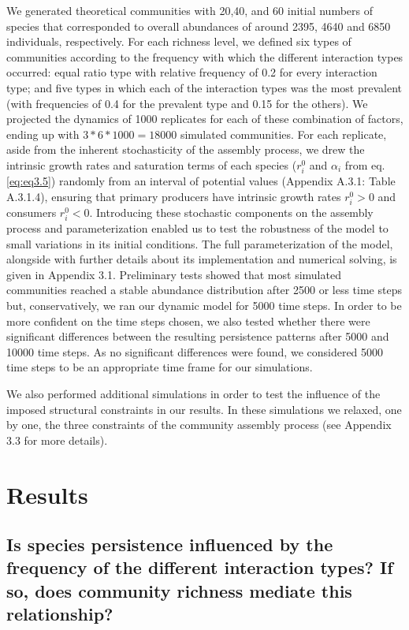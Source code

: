 We generated theoretical communities with 20,40, and 60 initial numbers of species that corresponded to overall abundances of around 2395, 4640 and 6850 individuals, respectively. For each richness level, we defined six types of communities according to the frequency with which the different interaction types occurred: equal ratio type with relative frequency of 0.2 for every interaction type; and five types in which each of the interaction types was the most prevalent (with frequencies of 0.4 for the prevalent type and 0.15 for the others). We projected the dynamics of 1000 replicates for each of these combination of factors, ending up with $3*6*1000 = 18000$ simulated communities. For each replicate, aside from the inherent stochasticity of the assembly process, we drew the intrinsic growth rates and saturation terms of each species ($r_{i}^{0}$ and $\alpha_i$ from eq. \ref{eq:eq3.5}) randomly from an interval of potential values (Appendix A.3.1: Table A.3.1.4), ensuring that primary producers have intrinsic growth rates $r_{i}^{0} > 0$ and consumers $r_{i}^{0} < 0$. Introducing these stochastic components on the assembly process and parameterization enabled us to test the robustness of the model to small variations in its initial conditions. The full parameterization of the model, alongside with further details about its implementation and numerical solving, is given in Appendix 3.1. Preliminary tests showed that most simulated communities reached a stable abundance distribution after 2500 or less time steps but, conservatively, we ran our dynamic model for 5000 time steps. In order to be more confident on the time steps chosen, we also tested whether there were significant differences between the resulting persistence patterns after 5000 and 10000 time steps. As no significant differences were found, we considered 5000 time steps to be an appropriate time frame for our simulations.

We also performed additional simulations in order to test the influence of the imposed structural constraints in our results. In these simulations we relaxed, one by one, the three constraints of the community assembly process (see Appendix 3.3 for more details).

\section{Results}

\subsection*{Is species persistence influenced by the frequency of the different interaction types? If so, does community richness mediate this relationship? }

